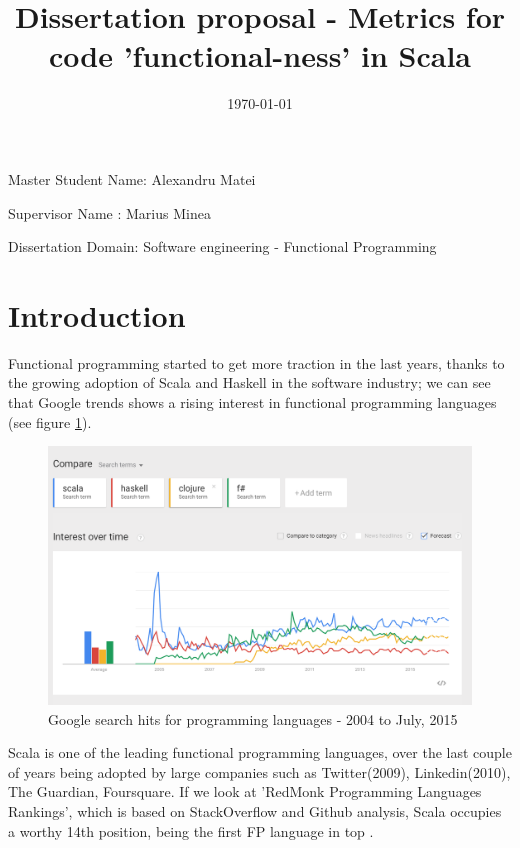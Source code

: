 \documentclass{article}
\title{Dissertation proposal - Metrics for code 'functional-ness' in Scala }
\date{\today}
\begin{document}
\maketitle

\vspace{30mm} %

\begin{center}
Master Student Name: Alexandru Matei \par
Supervisor Name : Marius Minea \par
Dissertation Domain: Software engineering - Functional Programming
\end{center}

\vfill

\newpage
\tableofcontents
\newpage

\section{Introduction}
Functional programming started to get more traction in the last years, thanks to the growing adoption of Scala and Haskell in the software industry; we can see that Google trends shows a rising interest in functional programming languages (see figure \ref{fig:google-rank}). \par

\begin{figure}[h!]
  \includegraphics[width=\linewidth]{google-trends.png}
  \caption{Google search hits for programming languages - 2004 to July, 2015 }
  \label{fig:google-rank}
\end{figure}

Scala is one of the leading functional programming languages, over the last couple of years being adopted by large companies such as  Twitter(2009), Linkedin(2010), The Guardian, Foursquare. If we look at 'RedMonk Programming Languages Rankings'\cite{redmonk:1}, which is based on StackOverflow and Github analysis,  Scala occupies a worthy 14th position, being the first FP language in top . \par
\end{document}
